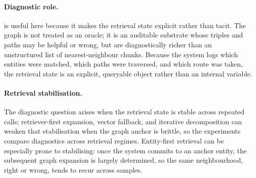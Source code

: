 \paragraph{Diagnostic role.}
\system{} is useful here because it makes the retrieval state explicit rather
than tacit.
The graph is not treated as an oracle; it is an auditable substrate whose
triples and paths may be helpful or wrong, but are diagnostically richer than
an unstructured list of nearest-neighbour chunks.
Because the system logs which entities were matched, which paths were
traversed, and which route was taken, the retrieval state is an explicit,
queryable object rather than an internal variable.

\paragraph{Retrieval stabilisation.}
The diagnostic question arises when the retrieval state is stable across
repeated calls; retriever-first expansion, vector fallback, and iterative
decomposition can weaken that stabilisation when the graph anchor is brittle,
so the experiments compare diagnostics across retrieval regimes.
Entity-first retrieval can be especially prone to stabilising: once the system
commits to an anchor entity, the subsequent graph expansion is largely
determined, so the same neighbourhood, right or wrong, tends to recur across
samples.
